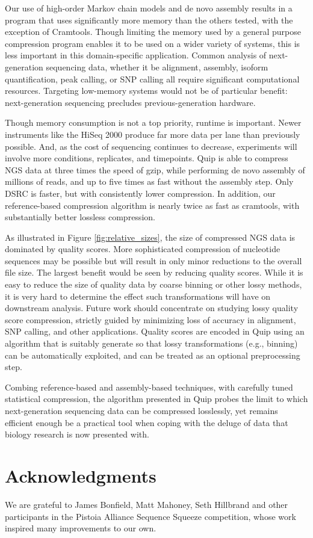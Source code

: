 \documentclass[twocolumn]{article}
\begin{document}
Our use of high-order Markov chain models and de novo assembly results in a
program that uses significantly more memory than the others tested, with the
exception of Cramtools. Though limiting the memory used by a general purpose
compression program enables it to be used on a wider variety of systems, this
is less important in this domain-specific application. Common analysis of
next-generation sequencing data, whether it be alignment, assembly, isoform
quantification, peak calling, or SNP calling all require significant
computational resources. Targeting low-memory systems would not be of
particular benefit: next-generation sequencing precludes previous-generation
hardware.

Though memory consumption is not a top priority, runtime is important. Newer
instruments like the HiSeq 2000 produce far more data per lane than previously
possible. And, as the cost of sequencing continues to decrease, experiments
will involve more conditions, replicates, and timepoints.  Quip is able to
compress NGS data at three times the speed of gzip, while performing de novo
assembly of millions of reads, and up to five times as fast without the
assembly step. Only DSRC is faster, but with consistently lower compression.
In addition, our reference-based compression algorithm is nearly twice as fast
as cramtools, with substantially better lossless compression.

As illustrated in Figure \ref{fig:relative_sizes}, the size of compressed NGS
data is dominated by quality scores. More sophisticated compression of
nucleotide sequences may be possible but will result in only minor reductions
to the overall file size. The largest benefit would be seen by reducing
quality scores. While it is easy to reduce the size of quality data by coarse
binning or other lossy methods, it is very hard to determine the effect such
transformations will have on downstream analysis. Future work should
concentrate on studying lossy quality score compression, strictly guided by
minimizing loss of accuracy in alignment, SNP calling, and other applications.
Quality scores are encoded in Quip using an algorithm that is suitably
generate so that lossy transformations (e.g., binning) can be automatically
exploited, and can be treated as an optional preprocessing step.

Combing reference-based and assembly-based techniques, with carefully tuned
statistical compression, the algorithm presented in Quip probes the limit to
which next-generation sequencing data can be compressed losslessly, yet
remains efficient enough be a practical tool when coping with the deluge of
data that biology research is now presented with.

\section*{Acknowledgments}

We are grateful to James Bonfield, Matt Mahoney, Seth Hillbrand and
other participants in the Pistoia Alliance Sequence Squeeze competition, whose work inspired many improvements to our own.



\end{document}
